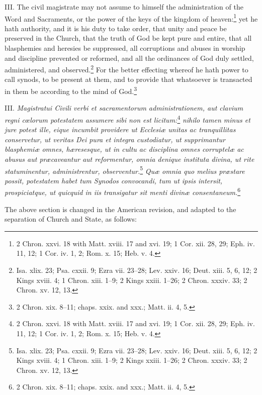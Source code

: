 III. The civil magistrate may not assume to himself the administration of the Word and Sacraments, or the power of the keys of the kingdom of heaven:\footnote{2 Chron. xxvi. 18 with Matt. xviii. 17 and xvi. 19; 1 Cor. xii. 28, 29; Eph. iv. 11, 12; 1 Cor. iv. 1, 2; Rom. x. 15; Heb. v. 4.} yet he hath authority, and it is his duty to take order, that unity and peace be preserved in the Church, that the truth of God be kept pure and entire, that all blasphemies and heresies be suppressed, all corruptions and abuses in worship and discipline prevented or reformed, and all the ordinances of God duly settled, administered, and observed.\footnote{Isa. xlix. 23; Psa. cxxii. 9; Ezra vii. 23–28; Lev. xxiv. 16; Deut. xiii. 5, 6, 12; 2 Kings xviii. 4; 1 Chron. xiii. 1–9; 2 Kings xxiii. 1–26; 2 Chron. xxxiv. 33; 2 Chron. xv. 12, 13.} For the better effecting whereof he hath power to call synods, to be present at them, and to provide that whatsoever is transacted in them be according to the mind of God.\footnote{2 Chron. xix. 8–11; chaps. xxix. and xxx.; Matt. ii. 4, 5.}

III. \emph{Magistratui Civili verbi et sacramentorum administrationem, aut clavium regni cœlorum potestatem assumere sibi non est licitum:}\footnote{2 Chron. xxvi. 18 with Matt. xviii. 17 and xvi. 19; 1 Cor. xii. 28, 29; Eph. iv. 11, 12; 1 Cor. iv. 1, 2; Rom. x. 15; Heb. v. 4.}\emph{ nihilo tamen minus et jure potest ille, eique incumbit providere ut Ecclesiæ unitas ac tranquillitas conservetur, ut veritas Dei pura et integra custodiatur, ut supprimantur blasphemiæ omnes, hæresesque, ut in cultu ac disciplina omnes corruptelæ ac abusus aut præcaveantur aut reformentur, omnia denique instituta divina, ut rite statuminentur, administrentur, observentur.}\footnote{Isa. xlix. 23; Psa. cxxii. 9; Ezra vii. 23–28; Lev. xxiv. 16; Deut. xiii. 5, 6, 12; 2 Kings xviii. 4; 1 Chron. xiii. 1–9; 2 Kings xxiii. 1–26; 2 Chron. xxxiv. 33; 2 Chron. xv. 12, 13.}\emph{ Quæ omnia quo melius præstare possit, potestatem habet tum Synodos convocandi, tum ut ipsis intersit, prospiciatque, ut quicquid in iis transigatur sit menti divinæ consentaneum.}\footnote{2 Chron. xix. 8–11; chaps. xxix. and xxx.; Matt. ii. 4, 5.}

The above section is changed in the American revision, and adapted to the separation of Church and State, as follows:

